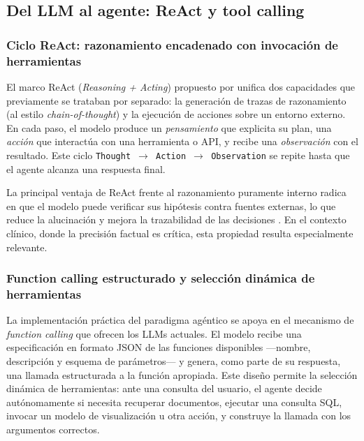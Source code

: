 \subsection{Del \acs{LLM} al agente: \acs{ReAct} y tool calling}
\label{subsec:react}

\subsubsection{Ciclo \ac{ReAct}: razonamiento encadenado con invocación de herramientas}

El marco \acs{ReAct} (\emph{Reasoning + Acting}) propuesto por \textcite{Yao2023ReAct} unifica dos capacidades que previamente se trataban por separado: la generación de trazas de razonamiento (al estilo \emph{chain-of-thought}) y la ejecución de acciones sobre un entorno externo. En cada paso, el modelo produce un \emph{pensamiento} que explicita su plan, una \emph{acción} que interactúa con una herramienta o \ac{API}, y recibe una \emph{observación} con el resultado. Este ciclo \texttt{Thought $\rightarrow$ Action $\rightarrow$ Observation} se repite hasta que el agente alcanza una respuesta final.

La principal ventaja de \ac{ReAct} frente al razonamiento puramente interno radica en que el modelo puede verificar sus hipótesis contra fuentes externas, lo que reduce la alucinación y mejora la trazabilidad de las decisiones \parencite{Yao2023ReAct}. En el contexto clínico, donde la precisión factual es crítica, esta propiedad resulta especialmente relevante.

\subsubsection{Function calling estructurado y selección dinámica de herramientas}

La implementación práctica del paradigma agéntico se apoya en el mecanismo de \emph{function calling} que ofrecen los \ac{LLM}s actuales. El modelo recibe una especificación en formato \ac{JSON} de las funciones disponibles ---nombre, descripción y esquema de parámetros--- y genera, como parte de su respuesta, una llamada estructurada a la función apropiada. Este diseño permite la selección dinámica de herramientas: ante una consulta del usuario, el agente decide autónomamente si necesita recuperar documentos, ejecutar una consulta \ac{SQL}, invocar un modelo de visualización u otra acción, y construye la llamada con los argumentos correctos.


